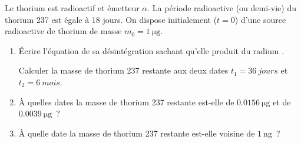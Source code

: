 Le thorium  est radioactif et émetteur $\alpha$. La période
radioactive (ou demi-vie) du thorium 237 est égale à 18 jours. On dispose
initialement ($t=0$) d'une source radioactive de thorium de masse
$m_{0}=\qty{1}{\ug}$.
\begin{enumerate}
    \item Écrire l'équation de sa désintégration sachant qu'elle produit du
          radium .

          Calculer la masse de thorium 237 restante aux deux dates
          $t_{1}=\qty{36}{jours}$ et $t_{2}=\qty{6}{mois}$.
    \item À quelles dates la masse de thorium 237 restante est-elle de
          $\qty{0.0156}{\ug}$ et de $\qty{0.0039}{\ug}$~?
    \item À quelle date la masse de thorium 237 restante est-elle voisine de
          $\qty{1}{\ng}$~?
\end{enumerate}

